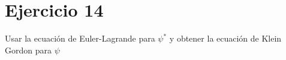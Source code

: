 \section*{Ejercicio 14}
Usar la ecuación de Euler-Lagrande para $\psi^*$ y obtener la ecuación de Klein Gordon para $\psi$